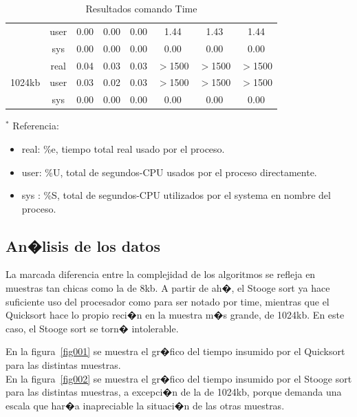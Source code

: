 \documentclass[a4paper,10pt]{article}
\begin{document}
\begin{table}[!htp]
\begin{center}
\begin{tabular}{cc|c|c|c|c|c|c|}
\multicolumn{1}{|c}{}                        &
\multicolumn{1}{|c|}{user} & 0.00 & 0.00 &0.00 & 1.44 & 1.43 & 1.44 \\ \cline{2-8}
\multicolumn{1}{|c}{}                        &
\multicolumn{1}{|c|}{sys} & 0.00 & 0.00 &0.00 & 0.00 & 0.00 & 0.00 \\ \cline{1-8}
\multicolumn{1}{|c}{\multirow{3}{*}{1024kb}} &
\multicolumn{1}{|c|}{real} & 0.04 & 0.03 &0.03 & $>$1500 & $>$1500 & $>$1500 \\ \cline{2-8}
\multicolumn{1}{|c}{}                        &
\multicolumn{1}{|c|}{user} & 0.03 & 0.02 &0.03 & $>$1500 & $>$1500 & $>$1500 \\ \cline{2-8}
\multicolumn{1}{|c}{}                        &
\multicolumn{1}{|c|}{sys} & 0.00 & 0.00 &0.00 & 0.00 & 0.00 & 0.00 \\ \cline{1-8}
\end{tabular}
\caption{Resultados comando Time } \label{tab001}
\end{center}
\end{table}

$^{*}$ Referencia: 
\begin{itemize}
 \item real: \%e, tiempo total real usado por el proceso.
 \item user: \%U, total de segundos-CPU usados por el proceso directamente.
 \item sys : \%S, total de segundos-CPU utilizados por el systema en nombre del proceso.
\end{itemize}



\subsection{An�lisis de los datos}

La marcada diferencia entre la complejidad de los algoritmos se refleja en muestras tan chicas como la de 8kb. 
A partir de ah�, el Stooge sort ya hace suficiente uso del procesador como para ser notado por time, mientras que el Quicksort hace lo propio reci�n en la muestra m�s grande, de 1024kb. En este caso, el Stooge sort se torn� intolerable.

En la figura~\ref{fig001} se muestra el gr�fico del tiempo insumido por el Quicksort para las distintas muestras.\\
En la figura~\ref{fig002} se muestra el gr�fico del tiempo insumido por el Stooge sort para las distintas muestras, a excepci�n de la de 1024kb, porque demanda una escala que har�a inapreciable la situaci�n de las otras muestras.
\end{document}
